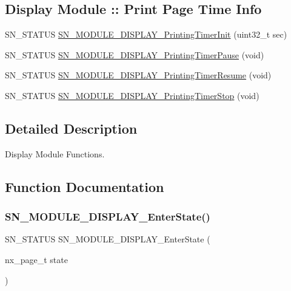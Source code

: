 \subsection*{Display Module \+:\+: Print Page Time Info}
\begin{DoxyCompactItemize}
\item 
S\+N\+\_\+\+S\+T\+A\+T\+US \hyperlink{group__DISPLAY_gac630c6bd386295f3008bc04e8b9c92a0}{S\+N\+\_\+\+M\+O\+D\+U\+L\+E\+\_\+\+D\+I\+S\+P\+L\+A\+Y\+\_\+\+Printing\+Timer\+Init} (uint32\+\_\+t sec)
\item 
S\+N\+\_\+\+S\+T\+A\+T\+US \hyperlink{group__DISPLAY_ga21d62aed53ed746d4912685df22c224a}{S\+N\+\_\+\+M\+O\+D\+U\+L\+E\+\_\+\+D\+I\+S\+P\+L\+A\+Y\+\_\+\+Printing\+Timer\+Pause} (void)
\item 
S\+N\+\_\+\+S\+T\+A\+T\+US \hyperlink{group__DISPLAY_ga457dd831602b689bb557899b06e69e3c}{S\+N\+\_\+\+M\+O\+D\+U\+L\+E\+\_\+\+D\+I\+S\+P\+L\+A\+Y\+\_\+\+Printing\+Timer\+Resume} (void)
\item 
S\+N\+\_\+\+S\+T\+A\+T\+US \hyperlink{group__DISPLAY_ga23a40fbba57f5da86b6173fe40861196}{S\+N\+\_\+\+M\+O\+D\+U\+L\+E\+\_\+\+D\+I\+S\+P\+L\+A\+Y\+\_\+\+Printing\+Timer\+Stop} (void)
\end{DoxyCompactItemize}


\subsection{Detailed Description}
Display Module Functions. 



\subsection{Function Documentation}
\mbox{\label{group__DISPLAY_ga91ef90fbda58e050514b22a2a564a82d}} 
\subsubsection{\texorpdfstring{S\+N\+\_\+\+M\+O\+D\+U\+L\+E\+\_\+\+D\+I\+S\+P\+L\+A\+Y\+\_\+\+Enter\+State()}{SN\_MODULE\_DISPLAY\_EnterState()}}
{\footnotesize\ttfamily S\+N\+\_\+\+S\+T\+A\+T\+US S\+N\+\_\+\+M\+O\+D\+U\+L\+E\+\_\+\+D\+I\+S\+P\+L\+A\+Y\+\_\+\+Enter\+State (\begin{DoxyParamCaption}\item[{nx\+\_\+page\+\_\+t}]{state }\end{DoxyParamCaption})}



